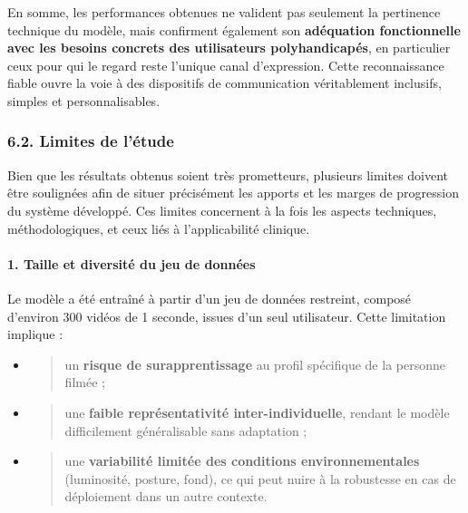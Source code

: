 \documentclass[
]{article}
\begin{document}
En somme, les performances obtenues ne valident pas seulement la pertinence technique du modèle, mais confirment également son \textbf{adéquation fonctionnelle avec les besoins concrets des utilisateurs polyhandicapés}, en particulier ceux pour qui le regard reste l'unique canal d'expression. Cette reconnaissance fiable ouvre la voie à des dispositifs de communication véritablement inclusifs, simples et personnalisables.

\hypertarget{limites-de-luxe9tude}{%
\subsubsection{6.2. Limites de l'étude}\label{limites-de-luxe9tude}}

Bien que les résultats obtenus soient très prometteurs, plusieurs limites doivent être soulignées afin de situer précisément les apports et les marges de progression du système développé. Ces limites concernent à la fois les aspects techniques, méthodologiques, et ceux liés à l'applicabilité clinique.

\hypertarget{taille-et-diversituxe9-du-jeu-de-donnuxe9es}{%
\paragraph{\texorpdfstring{\textbf{1. Taille et diversité du jeu de données}}{1. Taille et diversité du jeu de données}}\label{taille-et-diversituxe9-du-jeu-de-donnuxe9es}}

Le modèle a été entraîné à partir d'un jeu de données restreint, composé d'environ 300 vidéos de 1 seconde, issues d'un seul utilisateur. Cette limitation implique :

\begin{itemize}
\item
  \begin{quote}
  un \textbf{risque de surapprentissage} au profil spécifique de la personne filmée ;
  \end{quote}
\item
  \begin{quote}
  une \textbf{faible représentativité inter-individuelle}, rendant le modèle difficilement généralisable sans adaptation ;
  \end{quote}
\item
  \begin{quote}
  une \textbf{variabilité limitée des conditions environnementales} (luminosité, posture, fond), ce qui peut nuire à la robustesse en cas de déploiement dans un autre contexte.
  \end{quote}
\end{itemize}
\end{document}
